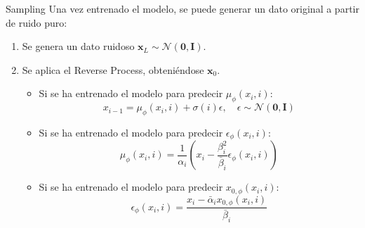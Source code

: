 \documentclass{beamer}
\begin{document}
\begin{frame}{Sampling}
    Una vez entrenado el modelo, se puede generar un dato original a partir de ruido puro:
    \begin{enumerate}
        \item Se genera un dato ruidoso $\mathbf{x}_L\sim \mathcal{N}(\mathbf{0}, \mathbf{I})$.
        \item Se aplica el Reverse Process, obteniéndose $\mathbf{x}_0$.
        \pause
        \begin{itemize}
            \item Si se ha entrenado el modelo para predecir $\mu_\phi(x_i, i)$:
            \begin{equation*}
                x_{i-1} = \mu_\phi(x_i, i) + \sigma(i) \epsilon, \quad \epsilon\sim\mathcal{N}(\mathbf{0}, \mathbf{I})
            \end{equation*}
            \pause
            \item Si se ha entrenado el modelo para predecir $\epsilon_\phi(x_i, i)$:
            \begin{equation*}
                \mu_\phi(x_i, i) = \frac{1}{\alpha_i} \left( x_i - \frac{\beta_i^2}{\bar{\beta}_i} \epsilon_\phi(x_i, i) \right)
            \end{equation*}
            \pause
            \item Si se ha entrenado el modelo para predecir $x_{0,\phi}(x_i, i)$:
            \begin{equation*}
                \epsilon_\phi(x_i, i) = \frac{x_i-\bar{\alpha}_i x_{0,\phi}(x_i, i)}{\bar{\beta}_i}
            \end{equation*}
        \end{itemize}
    \end{enumerate}
\end{frame}
\end{document}
